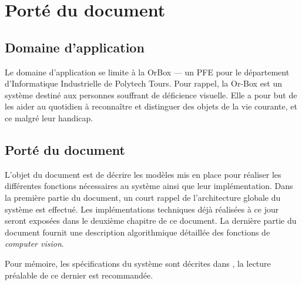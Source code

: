\chapter{Porté du document}

    \section{Domaine d'application}
    
    Le domaine d’application se limite à la OrBox --- un PFE pour le département d'Informatique Industrielle de Polytech Tours.
    Pour rappel, la Or-Box est un système destiné aux personnes souffrant de déficience visuelle.
    Elle a pour but de les aider au quotidien à reconnaître et distinguer des objets de la vie courante, et ce malgré leur handicap.
    
    \section{Porté du document}
    
    L’objet du document est de décrire les modèles mis en place pour réaliser les différentes fonctions nécessaires au système ainsi que leur implémentation.
    Dans la première partie du document, un court rappel de l'architecture globale du système est effectué.
    Les implémentations techniques déjà réalisées à ce jour seront exposées dans le deuxième chapitre de ce document.
    La dernière partie du document fournit une description algorithmique détaillée des fonctions de \emph{computer vision}.
    
    Pour mémoire, les spécifications du système sont décrites dans \cite{OBCdS}, la lecture préalable de ce dernier est recommandée.
    